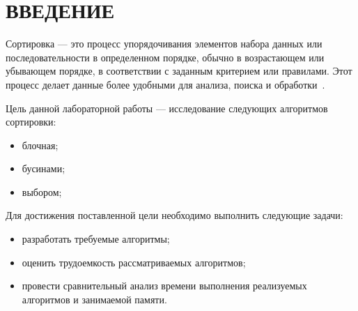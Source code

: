 \chapter*{ВВЕДЕНИЕ}

Сортировка --- это процесс упорядочивания элементов набора данных или последовательности в определенном порядке, обычно в возрастающем или убывающем порядке, в соответствии с заданным критерием или правилами. Этот процесс делает данные более удобными для анализа, поиска и обработки~\cite{intro}.


Цель данной лабораторной работы --- исследование следующих алгоритмов сортировки:

\begin{itemize}
	\item блочная;
	\item бусинами;
	\item выбором;
\end{itemize}


Для достижения поставленной цели необходимо выполнить следующие задачи:
\begin{itemize}
	\item разработать требуемые алгоритмы;
	\item оценить трудоемкость рассматриваемых алгоритмов;
	\item провести сравнительный анализ времени выполнения реализуемых алгоритмов и занимаемой памяти.
\end{itemize}
